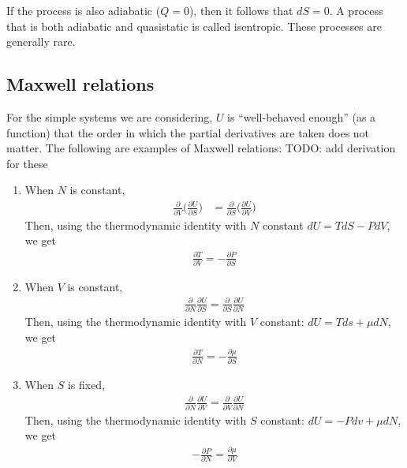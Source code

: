 \documentclass[11pt]{article}
\begin{document}
If the process is also adiabatic ($Q=0$), then it follows that $dS = 0$. A process that is both adiabatic and quasistatic is called isentropic. These processes are generally rare.

\subsection{Maxwell relations}
For the simple systems we are considering, $U$ is ``well-behaved enough'' (as a function) that the order in which the partial derivatives are taken does not matter. The following are examples of Maxwell relations: TODO: add derivation for these
\begin{enumerate}
    \item When $N$ is constant, 
\begin{align*}
    \frac{\partial }{\partial V} \Big(\frac{\partial U}{\partial S}\Big) &= \frac{\partial }{\partial S}\Big(\frac{\partial U}{\partial V}\Big)
\end{align*}
Then, using the thermodynamic identity with $N$ constant $dU = TdS - PdV$, we get 
\begin{align*}
    \frac{\partial T}{\partial V} = - \frac{\partial P}{\partial S}
\end{align*}

    \item When $V$ is constant, 
    \begin{align*}
        \frac{\partial}{\partial N} \frac{\partial U}{\partial S} = \frac{\partial }{\partial S} \frac{\partial U}{\partial N}
    \end{align*}
    Then, using the thermodynamic identity with $V$ constant: $dU = Tds + \mu dN$, we get
    \begin{align*}
        \frac{\partial T}{\partial N} = - \frac{\partial \mu }{\partial S}
    \end{align*}
    
    \item When $S$ is fixed, 
    \begin{align*}
        \frac{\partial }{\partial N}\frac{\partial U}{\partial V} = \frac{\partial }{\partial V} \frac{\partial U}{\partial N}
    \end{align*}
    Then, using the thermodynamic identity with $S$ constant: $dU = -Pdv + \mu dN$, we get
    \begin{align*}
        -\frac{\partial P}{\partial N} = \frac{\partial \mu}{\partial V}
    \end{align*}
\end{enumerate}
\end{document}
